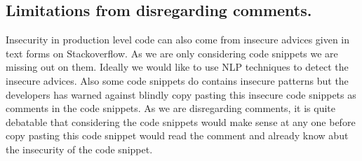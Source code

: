 
\noindent
\subsection{Limitations from disregarding comments.} Insecurity in production level code can also come from 
insecure advices given in text forms on Stackoverflow. 
As we are only considering code snippets we are missing out on them. 
Ideally we would like to use NLP techniques to detect the insecure advices. Also some code snippets do contains insecure patterns 
but the developers has warned against blindly copy pasting this insecure code snippets as comments in the code snippets. As we are disregarding
comments, it is quite debatable that considering the code snippets would make sense at any one before copy pasting this
code snippet would read the comment and already know abut the insecurity of the code snippet.     

\iffalse
Section 2 contains the insecure patterns, an illustrative code examples, and why they are insecure drawn from the existing literature.
Section 3 contains the program analysis, code repair techniques I have used.
In Table 4 I can not detect insecure pattern 3 -- Abuse of X509TrustManager Verifier Interface. I have try to explain the reasons in Appendix 10, and in Figure 5, and 6.
\fi